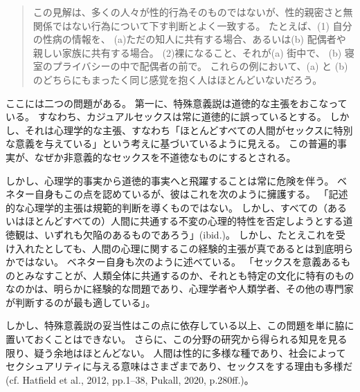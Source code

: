 \documentclass[paper=a4,book,openany]{jlreq}
\begin{document}
\begin{quote}
  この見解は、多くの人々が性的行為そのものではないが、性的親密さと無関係ではない行為について下す判断とよく一致する。
たとえば、(1) 自分の性病の情報を、 (a)ただの知人に共有する場合、あるいは(b) 配偶者や親しい家族に共有する場合。
(2)裸になること、それが(a) 街中で、 (b) 寝室のプライバシーの中で配偶者の前で。
これらの例において、(a) と (b) のどちらにもまったく同じ感覚を抱く人はほとんどいないだろう。
\citep[p.197]{benatar02:_two_views_sexual_ethic}
\end{quote}

ここには二つの問題がある。
第一に、特殊意義説は道徳的な主張をおこなっている。
すなわち、カジュアルセックスは常に道徳的に誤っているとする。
しかし、それは心理学的な主張、すなわち「ほとんどすべての人間がセックスに特別な意義を与えている」という考えに基づいているように見える。
この普遍的事実が、なぜか非意義的なセックスを不道徳なものにするとされる。

しかし、心理学的事実から道徳的事実へと飛躍することは常に危険を伴う。
ベネター自身もこの点を認めているが、彼はこれを次のように擁護する。
「記述的な心理学的主張は規範的判断を導くものではない。
しかし、すべての（あるいはほとんどすべての）人間に共通する不変の心理的特性を否定しようとする道徳観は、いずれも欠陥のあるものであろう」(ibid.)。
しかし、たとえこれを受け入れたとしても、人間の心理に関するこの経験的主張が真であるとは到底明らかではない。
ベネター自身も次のように述べている。
「セックスを意義あるものとみなすことが、人類全体に共通するのか、それとも特定の文化に特有のものなのかは、明らかに経験的な問題であり、心理学者や人類学者、その他の専門家が判断するのが最も適している」\citep[p.198]{benatar02:_two_views_sexual_ethic}。

しかし、特殊意義説の妥当性はこの点に依存している以上、この問題を単に脇に置いておくことはできない。
さらに、この分野の研究から得られる知見を見る限り、疑う余地はほとんどない。
人間は性的に多様な種であり、社会によってセクシュアリティに与える意味はさまざまであり、セックスをする理由も多様だ(cf. Hatfield et al., 2012, pp.1--38, Pukall, 2020, p.280ff.)\nocite{hatfield12:_cultur_social_gender}\nocite{pukall20:_human_sexual}。
\end{document}
